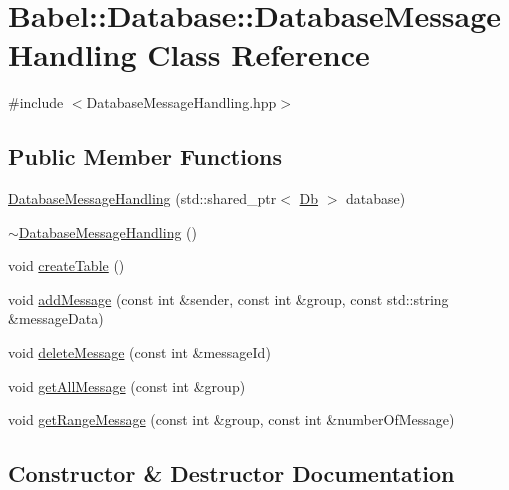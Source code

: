 \hypertarget{classBabel_1_1Database_1_1DatabaseMessageHandling}{}\section{Babel\+:\+:Database\+:\+:Database\+Message\+Handling Class Reference}
\label{classBabel_1_1Database_1_1DatabaseMessageHandling}


{\ttfamily \#include $<$Database\+Message\+Handling.\+hpp$>$}

\subsection*{Public Member Functions}
\begin{DoxyCompactItemize}
\item 
\hyperlink{classBabel_1_1Database_1_1DatabaseMessageHandling_abbbb6940ab5d814d743318a6c80675ae}{Database\+Message\+Handling} (std\+::shared\+\_\+ptr$<$ \hyperlink{classBabel_1_1Database_1_1Db}{Db} $>$ database)
\item 
\hyperlink{classBabel_1_1Database_1_1DatabaseMessageHandling_aa50d5b43b313897aaded49e7ffbee224}{$\sim$\+Database\+Message\+Handling} ()
\item 
void \hyperlink{classBabel_1_1Database_1_1DatabaseMessageHandling_ad8d704d5fe51d6745a950339528d6b6b}{create\+Table} ()
\item 
void \hyperlink{classBabel_1_1Database_1_1DatabaseMessageHandling_aa75b9f9b24f81d2eb37ec0a54f60ea86}{add\+Message} (const int \&sender, const int \&group, const std\+::string \&message\+Data)
\item 
void \hyperlink{classBabel_1_1Database_1_1DatabaseMessageHandling_a29572ed82c38b3335436fbf09bacf25b}{delete\+Message} (const int \&message\+Id)
\item 
void \hyperlink{classBabel_1_1Database_1_1DatabaseMessageHandling_a910b7dfbf08dede9bc52e7aed49d83a2}{get\+All\+Message} (const int \&group)
\item 
void \hyperlink{classBabel_1_1Database_1_1DatabaseMessageHandling_a531b0d53d4ff761134c487adb2bdbba8}{get\+Range\+Message} (const int \&group, const int \&number\+Of\+Message)
\end{DoxyCompactItemize}


\subsection{Constructor \& Destructor Documentation}
\mbox{\label{classBabel_1_1Database_1_1DatabaseMessageHandling_abbbb6940ab5d814d743318a6c80675ae}} 
